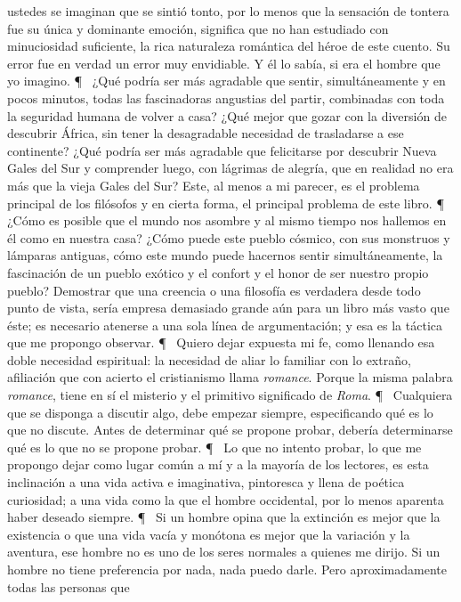 ustedes se imaginan que se sintió tonto, por lo menos que la sensación de tontera fue su única y
dominante emoción, significa que no han estudiado con minuciosidad suficiente, la rica naturaleza
romántica del héroe de este cuento. Su error fue en verdad un error muy envidiable. Y él lo sabía, si era el
hombre que yo imagino.
\P~
¿Qué podría ser más agradable que sentir, simultáneamente y en pocos minutos, todas las
fascinadoras angustias del partir, combinadas con toda la seguridad humana de volver a casa? ¿Qué mejor
que gozar con la diversión de descubrir África, sin tener la desagradable necesidad de trasladarse a ese
continente? ¿Qué podría ser más agradable que felicitarse por descubrir Nueva Gales del Sur y
comprender luego, con lágrimas de alegría, que en realidad no era más que la vieja Gales del Sur?
Este, al menos a mi parecer, es el problema principal de los filósofos y en cierta forma, el principal
problema de este libro.
\P~
¿Cómo es posible que el mundo nos asombre y al mismo tiempo nos hallemos en él como en
nuestra casa?
¿Cómo puede este pueblo cósmico, con sus monstruos y lámparas antiguas, cómo este mundo puede
hacernos sentir simultáneamente, la fascinación de un pueblo exótico y el confort y el honor de ser
nuestro propio pueblo?
Demostrar que una creencia o una filosofía es verdadera desde todo punto de vista, sería empresa
demasiado grande aún para un libro más vasto que éste; es necesario atenerse a una sola línea de
argumentación; y esa es la táctica que me propongo observar.
\P~
Quiero dejar expuesta mi fe, como llenando esa doble necesidad espiritual: la necesidad de aliar lo
familiar con lo extraño, afiliación que con acierto el cristianismo llama \emph{romance}. Porque la misma
palabra \emph{romance}, tiene en sí el misterio y el primitivo significado de \emph{Roma}.
\P~
Cualquiera que se disponga a discutir algo, debe empezar siempre, especificando qué es lo que no
discute. Antes de determinar qué se propone probar, debería determinarse qué es lo que no se propone
probar.
\P~
Lo que no intento probar, lo que me propongo dejar como lugar común a mí y a la mayoría de los
lectores, es esta inclinación a una vida activa e imaginativa, pintoresca y llena de poética curiosidad; a
una vida como la que el hombre occidental, por lo menos aparenta haber deseado siempre.
\P~
Si un hombre opina que la extinción es mejor que la existencia o que una vida vacía y monótona es
mejor que la variación y la aventura, ese hombre no es uno de los seres normales a quienes me dirijo. Si
un hombre no tiene preferencia por nada, nada puedo darle. Pero aproximadamente todas las personas que

